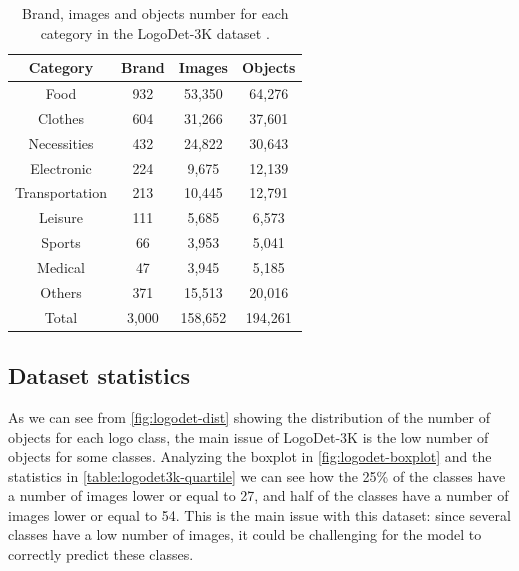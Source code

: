 \begin{table}[H]
    \centering
    \begin{tabular}{c | c  c  c } 
     \hline
     \textbf{Category} & \textbf{Brand} & \textbf{Images} & \textbf{Objects} \\
     \hline
    Food & 932 & 53,350 & 64,276 \\ 
    Clothes & 604 & 31,266 & 37,601 \\ 
    Necessities & 432 & 24,822 & 30,643 \\ 
    Electronic & 224 & 9,675 & 12,139 \\ 
    Transportation & 213 & 10,445 & 12,791 \\ 
    Leisure & 111 & 5,685 & 6,573 \\ 
    Sports & 66 & 3,953 & 5,041 \\ 
    Medical & 47 & 3,945 & 5,185 \\ 
    Others & 371 & 15,513 & 20,016 \\ 
    \hline
    Total & 3,000 & 158,652 & 194,261 \\ 

    \end{tabular}
    \caption{Brand, images and objects number for each category in the LogoDet-3K dataset \cite{wang2022logodet}.}
    \label{table:logodet3k-category-statistics}
\end{table}

\subsection{Dataset statistics}
\label{sec:dataset-stat}
As we can see from \autoref{fig:logodet-dist} showing the distribution of the number of objects for each logo class, the main issue of LogoDet-3K is the low number of objects for some classes. Analyzing the boxplot in \autoref{fig:logodet-boxplot} and the statistics in \autoref{table:logodet3k-quartile} we can see how the 25\% of the classes have a number of images lower or equal to 27, and half of the classes have a number of images lower or equal to 54. This is the main issue with this dataset: since several classes have a low number of images, it could be challenging for the model to correctly predict these classes.  

